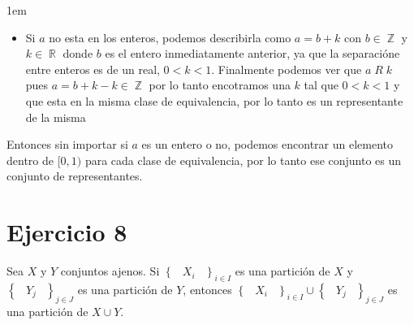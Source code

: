 \documentclass[12pt, fleqn]{article}                             %
\newenvironment{SmallIndentation}[1][0.75em]                    %
    {\begin{adjustwidth}{#1}{}\begin{footnotesize}}                 %
    {\end{footnotesize}\end{adjustwidth}}                           %
\DeclareMathOperator \Space {\quad}                             %
\DeclareMathOperator \MiniSpace {\;}                            %
\newcommand{\Set}[1]{\left\{ \MiniSpace #1 \MiniSpace \right\}} %
\DeclareMathOperator \Integers  {\mathbb{Z}}                     %
\DeclareMathOperator \Reals     {\mathbb{R}}                     %
\begin{document}
\begin{SmallIndentation}[1em]
\begin{itemize}
            \item
                Si $a$ no esta en los enteros, podemos describirla como $a=b+k$ con $b \in \Integers$ y
                $k \in \Reals$ donde $b$ es el entero inmediatamente anterior, ya que la separacióne entre
                enteros es de un real, $0 < k < 1$.
                Finalmente podemos ver que $a \; R \; k$ pues $a=b+k-k \in \Integers$ por lo tanto encotramos
                una $k$ tal que $0 < k < 1$ y que esta en la misma clase de equivalencia, por lo tanto
                es un representante de la misma

        \end{itemize}

        Entonces sin importar si $a$ es un entero o no, podemos encontrar un elemento dentro de $[0,1)$
        para cada clase de equivalencia, por lo tanto ese conjunto es un conjunto de representantes.

    \end{SmallIndentation}
        





\clearpage
\section{Ejercicio 8}


    Sea $X$ y $Y$ conjuntos ajenos. Si $\Set{X_i}_{i \in I}$ es una partición de $X$
    y $\Set{Y_j}_{j \in J}$ es una partición de $Y$, entonces $\Set{X_i}_{i \in I} \cup \Set{Y_j}_{j \in J}$
    es una partición de $X \cup Y$.
\end{document}

